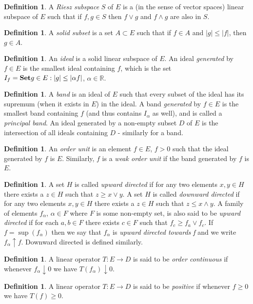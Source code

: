 \documentclass[letterpaper,10pt,oneside,onecolumn,reqno]{amsart}
\newcommand{\R}{\mathbb R}
\theoremstyle{definition}
\newtheorem{defn}[thm]{Definition}
\newcommand{\catname}[1]{{\normalfont\textbf{#1}}}
\newcommand{\Set}{\catname{Set}}
\begin{document}
\begin{defn}
A \emph{Riesz subspace} $S$ of $E$ is a (in the sense of vector spaces) linear subspace of $E$ such that if $f,g \in S$ then $f \vee g$ and $f \wedge g$ are also in $S$.
\end{defn}

\begin{defn}
 A \emph{solid subset} is a set $A \subset E$ such that if $f \in A$ and $|g| \leq |f|$, then $g \in A$.
\end{defn}

\begin{defn}
An \emph{ideal} is a solid linear subspace of $E$. An ideal \emph{generated} by $f\in E$ is the smallest ideal containing $f$, which is the set $I_{f} = \Set{g \in E: |g| \leq |\alpha f|}$, $\alpha \in \R$. 
\end{defn}

\begin{defn}
A \emph{band} is an ideal of $E$ such that every subset of the ideal has its supremum (when it exists in $E$) in the ideal. A band \emph{generated} by $f\in E$ is the smallest band containing $f$ (and thus contains $I_{\alpha}$ as well), and is called a \emph{principal band}. An ideal generated by a non-empty subset $D$ of $E$ is the intersection of all ideals containing $D$ - similarly for a band.
\end{defn}

\begin{defn}
An \emph{order unit} is an element $f \in E$, $f > 0$ such that the ideal generated by $f$ is $E$. Similarly, $f$ is a \emph{weak order unit} if the band generated by $f$ is $E$.
\end{defn}


\begin{defn}
A set $H$ is called \emph{upward directed} if for any two elements $x,y \in H$ there exists a $z \in H$ such that $z \geq x \vee y$. A set $H$ is called \emph{downward directed} if for any two elements $x,y \in H$ there exists a $z \in H$ such that $z \leq x \wedge y$. A family of elements $f_{\alpha}$, $\alpha \in F$ where $F$ is some non-empty set, is also said to be \emph{upward directed} if for each $a,b \in F$ there exists $c \in F$ such that $f_c \geq f_a \vee f_c$. If $f = \sup({f_\alpha})$ then we say that $f_{\alpha}$ is \emph{upward directed towards f} and we write $f_{\alpha}\uparrow f$. Downward directed is defined similarly. 
\end{defn}

\begin{defn}
A linear operator $T : E \to D$ is said to be \emph{order continuous} if whenever $f_{\alpha} \downarrow 0$ we have $T(f_{\alpha}) \downarrow 0$.
\end{defn}
\begin{defn}
A linear operator $T : E \to D$ is said to be \emph{positive} if whenever $f \geq 0$ we have $T(f) \geq 0$.
\end{defn}
\end{document}
